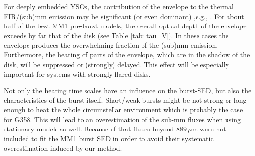 For deeply embedded YSOs, the contribution of the envelope to the thermal FIR/(sub)mm emission may be significant (or even dominant) ,e.g., \cite{10.1093/mnras/staa1254}. For about half of the best MM1 pre-burst models, the overall optical depth of the envelope exceeds by far that of the disk (see Table \ref{tab: tau_V}). In these cases the envelope produces the overwhelming fraction of the (sub)mm emission. 
Furthermore, the heating of parts of the envelope, which are in the shadow of the disk, will be suppressed or (strongly) delayed. This effect will be especially important for systems with strongly flared disks. 

Not only the heating time scales have an influence on the burst-SED, but also the characteristics of the burst itself. Short/weak bursts might be not strong or long enough to heat the %
whole circumstellar environment which is probably the case for G358. 
This will lead to an overestimation of the sub-mm fluxes when using stationary models as well. Because of that
fluxes beyond $889\,\mu $m were not included to fit the MM1 burst SED in order to avoid their systematic overestimation induced by our method.

